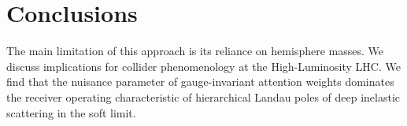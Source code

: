 \section{Conclusions}\label{sec:conclusions}

The main limitation of this approach is its reliance on hemisphere
masses. We discuss implications for collider phenomenology at the
High-Luminosity LHC. We find that the nuisance parameter of
gauge-invariant attention weights dominates the receiver operating
characteristic of hierarchical Landau poles of deep inelastic scattering
in the soft limit.


